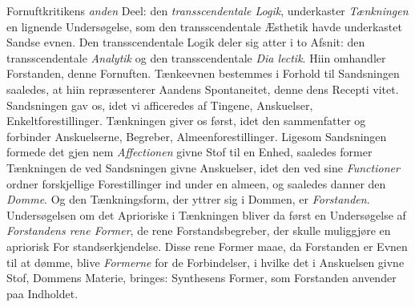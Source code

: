 \documentclass[12pt,a4paper]{book}
\begin{document}
Fornuftkritikens \emph{anden} Deel: den \emph{transscendentale
Logik}, underkaster \emph{Tænkningen} en lignende Undersøgelse,
som den transscendentale Æsthetik havde underkastet Sandse\-%
evnen. Den transscendentale Logik deler sig atter i to Afsnit:
den transscendentale \emph{Analytik} og den transscendentale \emph{Dia\-%
lectik}. Hiin omhandler Forstanden, denne Fornuften.
Tænkeevnen bestemmes i Forhold til Sandsningen saaledes, at
hiin repræsenterer Aandens Spontaneitet, denne dens Recepti\-%
vitet. Sandsningen gav os, idet vi afficeredes af Tingene,
Anskuelser, Enkeltforestillinger. Tænkningen giver os først,
idet den sammenfatter og forbinder Anskuelserne, Begreber,
Almeenforestillinger. Ligesom Sandsningen formede det gjen\-%
nem \emph{Affectionen} givne Stof til en Enhed, saaledes former
Tænkningen de ved Sandsningen givne Anskuelser, idet den
ved sine \emph{Functioner} ordner forskjellige Forestillinger ind
under en almeen, og saaledes danner den \emph{Domme}. Og den
Tænkningsform, der yttrer sig i Dommen, er \emph{Forstanden}.
Undersøgelsen om det Aprioriske i Tænkningen bliver da
først en Undersøgelse af \emph{Forstandens rene Former}, de
rene Forstandsbegreber, der skulle muliggjøre en apriorisk For\-%
standserkjendelse. Disse rene Former maae, da Forstanden
er Evnen til at dømme, blive \emph{Formerne} for de Forbindelser,
i hvilke det i Anskuelsen givne Stof, Dommens Materie, bringes:
Synthesens Former, som Forstanden anvender paa Indholdet.
\end{document}
